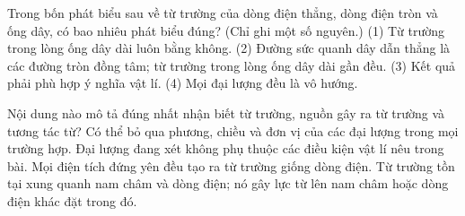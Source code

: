 \begin{ex}
Trong bốn phát biểu sau về từ trường của dòng điện thẳng, dòng điện tròn và ống dây, có bao nhiêu phát biểu đúng? (Chỉ ghi một số nguyên.) (1) Từ trường trong lòng ống dây dài luôn bằng không. (2) Đường sức quanh dây dẫn thẳng là các đường tròn đồng tâm; từ trường trong lòng ống dây dài gần đều. (3) Kết quả phải phù hợp ý nghĩa vật lí. (4) Mọi đại lượng đều là vô hướng.
\end{ex}

\begin{ex}
Nội dung nào mô tả đúng nhất nhận biết từ trường, nguồn gây ra từ trường và tương tác từ?
\choice
{Có thể bỏ qua phương, chiều và đơn vị của các đại lượng trong mọi trường hợp.}
{Đại lượng đang xét không phụ thuộc các điều kiện vật lí nêu trong bài.}
{Mọi điện tích đứng yên đều tạo ra từ trường giống dòng điện.}
{\True Từ trường tồn tại xung quanh nam châm và dòng điện; nó gây lực từ lên nam châm hoặc dòng điện khác đặt trong đó.}
\end{ex}

